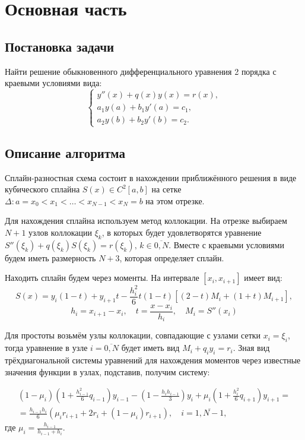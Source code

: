 \section{Основная часть}

\subsection{Постановка задачи}
    Найти решение обыкновенного дифференциального уравнения 2 порядка с краевыми условиями вида:
    \[
        \begin{cases}
            y''(x) + q(x) y(x) = r(x), \\
            a_1 y(a) + b_1 y'(a) = c_1, \\
            a_2 y(b) + b_2 y'(b) = c_2.
        \end{cases}
    \]

\subsection{Описание алгоритма}
    Сплайн-разностная схема состоит в нахождении приближённого решения в виде кубического сплайна \( S(x) \in C^2[a,b] \) на сетке \\ \( \Delta: a = x_0 < x_1 < \dots < x_{N-1} < x_N = b \) на этом отрезке.

    Для нахождения сплайна используем метод коллокации. На отрезке выбираем \( N+1 \) узлов коллокации \( \xi_k \), в которых будет удовлетворятся уравнение
    \( S''(\xi_k) + q(\xi_k) S(\xi_k) = r(\xi_k), \, k \in \overline{0,N} \). Вместе с краевыми условиями будем иметь размерность \( N+3 \), которая определяет сплайн.

    Находить сплайн будем через моменты. На интервале \( [x_i, x_{i+1}] \) имеет вид:
    \[
        S(x) = y_i(1-t) + y_{i+1} t - \frac{h^2_i}{6} t (1-t) \left[ (2-t) M_i + (1+t)M_{i+1} \right],
    \]
    \[
        h_i = x_{i+1} - x_i, \quad t = \frac{x - x_i}{h_i}, \quad M_i = S''(x_i)
    \]

    Для простоты возьмём узлы коллокации, совпадающие с узлами сетки \( x_i = \xi_i \), тогда уравнение в узле \(i = \overline{0,N}\) будет иметь вид \( M_i + q_i y_i = r_i \). Зная вид трёхдиагональной системы уравнений для нахождения моментов через известные значения функции в узлах, подставив, получим систему:
    
    \begin{multline*}
    (1-\mu_i)\left( 1 + \frac{h^2_{i-1}}{6} q_{i-1} \right)y_{i-1} - \left( 1 - \frac{h_i h_{i-1}}{3} \right) y_i + \mu_i \left( 1 + \frac{h^2_i}{6} q_{i+1} \right)y_{i+1} = \\ = \frac{h_{i-1} h_{i}}{6} (\mu_i r_{i+1} + 2r_i + (1-\mu_i)r_{i+1}), \quad i = \overline{1,N-1},
    \end{multline*}
    где \( \mu_i = \frac{h_{i-1}}{h_{i-1} + h_i} \).

